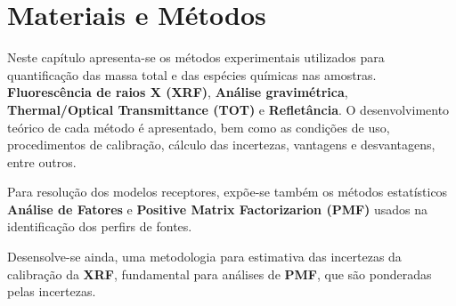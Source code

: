 \chapter{Materiais e Métodos}

Neste capítulo apresenta-se os métodos experimentais utilizados para 
quantificação das massa total e das espécies químicas nas amostras. 
\textbf{Fluorescência de raios X (XRF)}, \textbf{Análise gravimétrica},
\textbf{Thermal/Optical Transmittance (TOT)} e \textbf{Refletância}.
O desenvolvimento teórico de cada método é apresentado, bem como 
as condições de uso, procedimentos de calibração, cálculo das incertezas, 
vantagens e desvantagens, entre outros.

Para resolução dos modelos receptores, expõe-se também os métodos 
estatísticos \textbf{Análise de Fatores} e 
\textbf{Positive Matrix Factorizarion (PMF)} usados na identificação 
dos perfirs de fontes. 

Desensolve-se ainda, uma metodologia para estimativa das incertezas
da calibração da \textbf{XRF}, fundamental para análises de \textbf{PMF},
que são ponderadas pelas incertezas.







